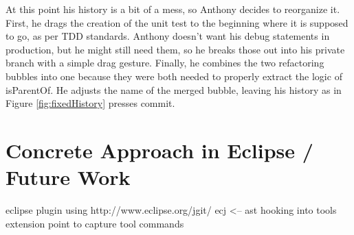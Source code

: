 \documentclass[conference]{IEEEtran}
\begin{document}
At this point his history is a bit of a mess, so Anthony decides to reorganize it.
First, he drags the creation of the unit test to the beginning where it is supposed to go, as per TDD standards.
Anthony doesn't want his debug statements in production, but he might still need them,
 so he breaks those out into his private branch with a simple drag gesture.
Finally, he combines the two refactoring bubbles into one because they were both needed to properly extract
the logic of isParentOf.
He adjusts the name of the merged bubble, leaving his history as in Figure \ref{fig:fixedHistory} presses commit.

\section{Concrete Approach in Eclipse / Future Work}

eclipse plugin using http://www.eclipse.org/jgit/
ecj <-- ast
hooking into tools extension point to capture tool commands







\end{document}
